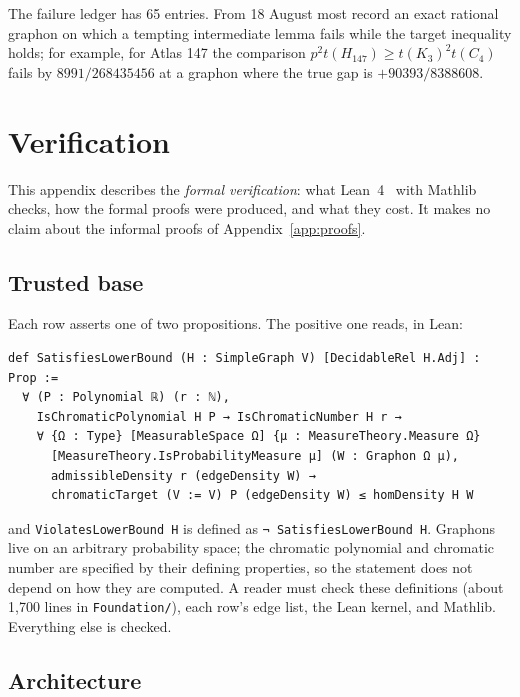 \documentclass[11pt,a4paper]{article}
\newcommand{\ttt}[1]{\texttt{#1}}
\begin{document}
The failure ledger has 65 entries. From 18 August most record an exact rational graphon on which a tempting
intermediate lemma fails while the target inequality holds; for example, for Atlas 147 the comparison
$p^2t(H_{147})\ge t(K_3)^2t(C_4)$ fails by $8991/268435456$ at a graphon where the true gap is
$+90393/8388608$.

\section{Verification}\label{app:verification}

This appendix describes the \emph{formal verification}: what Lean~4~\cite{demoura2021} with
Mathlib~\cite{mathlib2020} checks, how the formal proofs were produced, and what they cost. It makes no claim
about the informal proofs of Appendix~\ref{app:proofs}.

\subsection{Trusted base}\label{app:trusted}

Each row asserts one of two propositions. The positive one reads, in Lean:
\begin{small}
\begin{verbatim}
def SatisfiesLowerBound (H : SimpleGraph V) [DecidableRel H.Adj] : Prop :=
  ∀ (P : Polynomial ℝ) (r : ℕ),
    IsChromaticPolynomial H P → IsChromaticNumber H r →
    ∀ {Ω : Type} [MeasurableSpace Ω] {μ : MeasureTheory.Measure Ω}
      [MeasureTheory.IsProbabilityMeasure μ] (W : Graphon Ω μ),
      admissibleDensity r (edgeDensity W) →
      chromaticTarget (V := V) P (edgeDensity W) ≤ homDensity H W
\end{verbatim}
\end{small}
and \ttt{ViolatesLowerBound H} is defined as \ttt{¬ SatisfiesLowerBound H}. Graphons live on an arbitrary
probability space; the chromatic polynomial and chromatic number are specified by their defining properties, so
the statement does not depend on how they are computed. A reader must check these definitions (about 1,700 lines
in \ttt{Foundation/}), each row's edge list, the Lean kernel, and Mathlib. Everything else is checked.

\subsection{Architecture}
\end{document}
